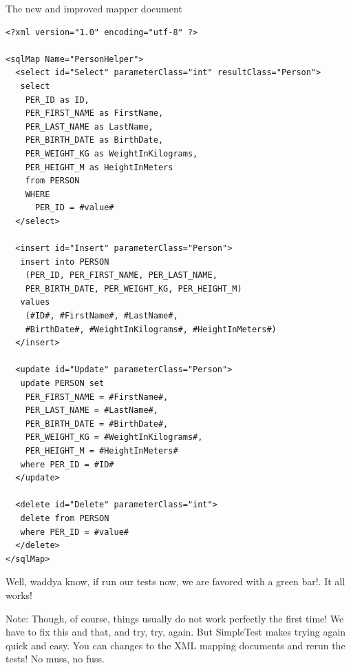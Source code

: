 \begin{example}
The new and improved mapper document
\begin{verbatim}
<?xml version="1.0" encoding="utf-8" ?>

<sqlMap Name="PersonHelper">
  <select id="Select" parameterClass="int" resultClass="Person">
   select
    PER_ID as ID,
    PER_FIRST_NAME as FirstName,
    PER_LAST_NAME as LastName,
    PER_BIRTH_DATE as BirthDate,
    PER_WEIGHT_KG as WeightInKilograms,
    PER_HEIGHT_M as HeightInMeters
    from PERSON
    WHERE
      PER_ID = #value#
  </select>

  <insert id="Insert" parameterClass="Person">
   insert into PERSON
    (PER_ID, PER_FIRST_NAME, PER_LAST_NAME,
    PER_BIRTH_DATE, PER_WEIGHT_KG, PER_HEIGHT_M)
   values
    (#ID#, #FirstName#, #LastName#,
    #BirthDate#, #WeightInKilograms#, #HeightInMeters#)
  </insert>

  <update id="Update" parameterClass="Person">
   update PERSON set
    PER_FIRST_NAME = #FirstName#,
    PER_LAST_NAME = #LastName#,
    PER_BIRTH_DATE = #BirthDate#,
    PER_WEIGHT_KG = #WeightInKilograms#,
    PER_HEIGHT_M = #HeightInMeters#
   where PER_ID = #ID#
  </update>

  <delete id="Delete" parameterClass="int">
   delete from PERSON
   where PER_ID = #value#
  </delete>
</sqlMap>
\end{verbatim}
\end{example}
Well, waddya know, if run our tests now, we are favored with a green bar!. It
all works!

\begin{mybox}{Note:}
Though, of course, things usually do not work perfectly the first time! We
have to fix this and that, and try, try, again. But SimpleTest makes trying
again quick and easy. You can changes to the XML mapping documents and rerun
the tests! No muss, no fuss.
\end{mybox}

